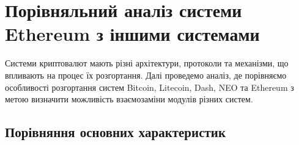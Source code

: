 \chapter{Порівняльний аналіз системи Ethereum з іншими системами}
\label{chap:theory}

Системи криптовалют мають різні архітектури, протоколи та механізми, що впливають на процес їх розгортання. Далі проведемо аналіз, де порівняємо особливості розгортання систем Bitcoin, Litecoin, Dash, NEO та Ethereum з метою визначити можливість взаємозаміни модулів різних систем.

\section{Порівняння основних характеристик}

